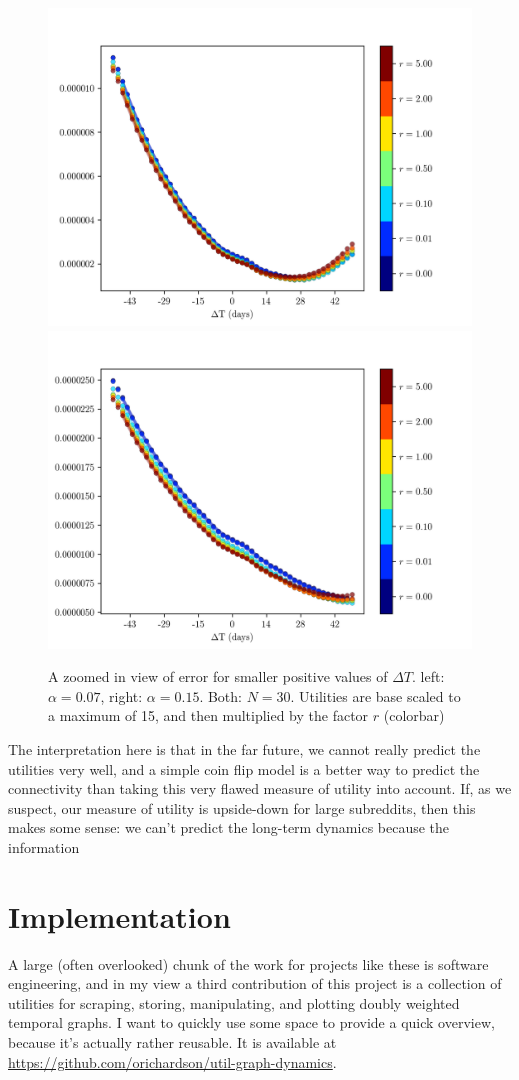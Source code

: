 \documentclass{article}
\theoremstyle{definition}
\begin{document}
	\begin{figure}
		\includegraphics[width=0.5\linewidth]{figs/uscale/G2D30_a07.png}
		\includegraphics[width=0.5\linewidth]{figs/uscale/G2D30_a15.png}
		\caption{\color{darkgray} A zoomed in view of error for smaller positive values of $\Delta T$. left: $\alpha = 0.07$, right: $\alpha =0.15$. Both: $N = 30$. Utilities are base scaled to a maximum of 15, and then multiplied by the factor $r$ (colorbar)} \label{fig:resolvenorm}
	\end{figure}

	The interpretation here is that in the far future, we cannot really predict the utilities very well, and a simple coin flip model is a better way to predict the connectivity than taking this very flawed measure of utility into account. If, as we suspect, our measure of utility is upside-down for large subreddits, then this makes some sense: we can't predict the long-term dynamics because the information
	
	\section{Implementation}
	A large (often overlooked) chunk of the work for projects like these is software engineering, and in my view a third contribution of this project is a collection of utilities for scraping, storing, manipulating, and plotting doubly weighted temporal graphs. I want to quickly use some space to provide a quick overview, because it's actually rather reusable. It is available at \url{https://github.com/orichardson/util-graph-dynamics}. 
	
\end{document}
